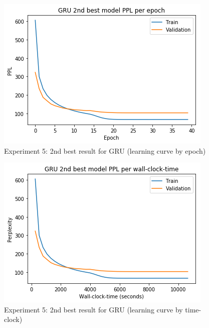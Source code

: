 \begin{itemize}
\begin{figure}[H]
	\centering
	\includegraphics[scale=0.8]{Q4-3_GRU_2epoch.png}
	\caption{Experiment 5: 2nd best result for GRU (learning curve by epoch)}
	\label{fig:fig21GRU}
\end{figure}
\begin{figure}[H]
	\centering
	\includegraphics[scale=0.8]{Q4-3_GRU_2time.png}
	\caption{Experiment 5: 2nd best result for GRU (learning curve by time-clock)}
	\label{fig:fig21bGRU}
\end{figure}


\end{itemize}
